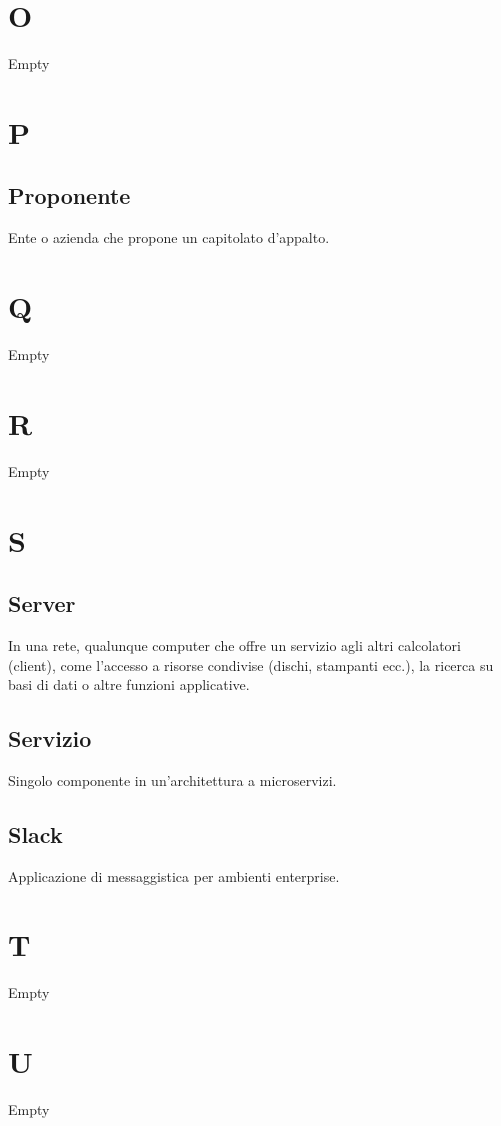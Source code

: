 \section*{O}
Empty

\section*{P}
\subsection*{Proponente}
Ente o azienda che propone un capitolato d'appalto.

\section*{Q}
Empty

\section*{R}
Empty

\section*{S}
\subsection*{Server}
In una rete, qualunque computer che offre un servizio agli altri calcolatori (client), come l'accesso a risorse condivise (dischi, stampanti ecc.), la ricerca su basi di dati o altre funzioni applicative.

\subsection*{Servizio}
Singolo componente in un'architettura a microservizi.

\subsection*{Slack}
Applicazione di messaggistica per ambienti enterprise.

\section*{T}
Empty

\section*{U}
Empty

